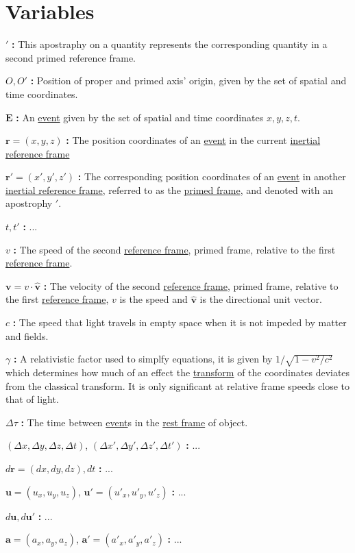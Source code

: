 \section{Variables}

\noindent ${'}$ \textbf{:}
This apostraphy on a quantity represents the corresponding quantity in a second primed reference frame.

\noindent ${O},{O{'}}$ \textbf{:}
Position of proper and primed axis' origin, given by the set of spatial and time coordinates.

\noindent ${\mathbf{E}}$ \textbf{:}
An \hyperlink{def-event}{event} given by the set of spatial and time coordinates $x,y,z,t$. %

\noindent ${\mathbf{r}} = ({x},{y},{z})$ \textbf{:}
The position coordinates of an \hyperlink{def-event}{event} in the current \hyperlink{def-Inertial-reference-frame}{inertial reference frame}

\noindent ${\mathbf{r}{'}} = ({x{'}},{y{'}},{z{'}})$ \textbf{:}
The corresponding position coordinates of an \hyperlink{def-event}{event} in another \hyperlink{def-Inertial-reference-frame}{inertial reference frame}, referred to as the \hyperlink{def-Primed-Frame}{primed frame}, and denoted with an apostrophy ${'}$.

\noindent ${t},{t{'}}$ \textbf{:}
...

\noindent ${v}$ \textbf{:}
The speed of the second \hyperlink{def-Reference-frame}{reference frame}, primed frame, relative to the first \hyperlink{def-Reference-frame}{reference frame}.

\noindent ${\mathbf{v}}={v} \cdot {\mathbf{\hat{v}}}$ \textbf{:}
The velocity of the second \hyperlink{def-Reference-frame}{reference frame}, primed frame, relative to the first \hyperlink{def-Reference-frame}{reference frame}, ${v}$ is the speed and ${\mathbf{\hat{v}}}$ is the directional unit vector.

\noindent ${c}$ \textbf{:}
The speed that light travels in empty space when it is not impeded by matter and fields.

\noindent ${\gamma}$ \textbf{:}
A relativistic factor used to simplfy equations, it is given by ${1/\sqrt{1-v^2/c^2}}$ which determines how much of an effect the \hyperlink{def-transform}{transform} of the coordinates deviates from the classical transform. It is only significant at relative frame speeds close to that of light.

\noindent ${\Delta \tau}$ \textbf{:}
The time between \hyperlink{def-event}{event}s in the \hyperlink{def-proper-frame}{rest frame} of object.

\noindent $({\Delta x},{\Delta y},{\Delta z},{\Delta t})$, $({\Delta x{'}},{\Delta y{'}},{\Delta z{'}},{\Delta t{'}})$ \textbf{:}
...

\noindent ${d\mathbf{r}} = ({dx},{dy},{dz}) , {dt}$ \textbf{:}
...

\noindent ${\mathbf{u}}=({u_x},{u_y},{u_z})$, ${\mathbf{u}'}=({u'_x},{u'_y},{u'_z})$  \textbf{:}
...

\noindent ${d\mathbf{u}},{d\mathbf{u}{'}}$ \textbf{:}
...

\noindent ${\mathbf{a}}=({a_x},{a_y},{a_z})$, ${\mathbf{a}'}=({a'_x},{a'_y},{a'_z})$  \textbf{:}
...
